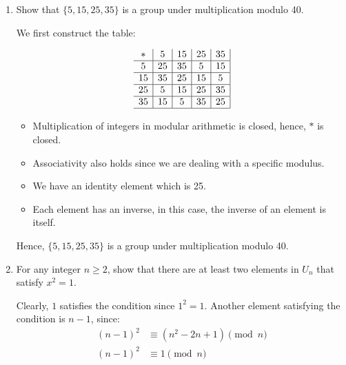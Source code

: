     \newpage
    \begin{example}[Seatwork]
        \mbox{}

        \begin{enumerate}
            \item Show that \(\{5, 15, 25, 35\}\) is a group under multiplication modulo 40.

            We first construct the table:

            \[
                \begin{array}{c|c|c|c|c|}
                    * & 5 & 15 & 25 & 35 \\ \hline
                    5  & 25 & 35 &  5 & 15 \\ \hline
                    15 & 35 & 25 & 15 &  5 \\ \hline
                    25 &  5 & 15 & 25 & 35 \\ \hline
                    35 & 15 & 5 & 35 & 25 \\ \hline
                \end{array}
            \]

            \begin{itemize}
                \item Multiplication of integers in modular arithmetic is closed, hence, \(*\) is closed.
                \item Associativity also holds since we are dealing with a specific modulus.
                \item We have an identity element which is 25.
                \item Each element has an inverse, in this case, the inverse of an element is itself.
            \end{itemize}

            Hence, \(\{5, 15, 25, 35\}\) is a group under multiplication modulo 40.

            \item For any integer \(n \geq 2\), show that there are at least two elements in \(U_n\) that satisfy \(x^2 = 1\).

            Clearly, \(1\) satisfies the condition since \(1^2 = 1\). Another element satisfying the condition is \(n - 1\), since:
            \begin{align*}
                (n - 1)^2 &\equiv (n^2 - 2n + 1) \pmod{n} \\
                (n - 1)^2 &\equiv 1 \pmod{n}
            \end{align*}


\end{enumerate}
\end{example}
